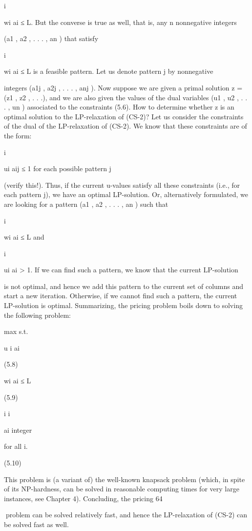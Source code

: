 \documentclass[titlepage]{book}
\theoremstyle{plain}
\theoremstyle{definition}
\theoremstyle{remark}
\begin{document}
i

wi ai ≤ L. But the converse is true as well, that is, any n nonnegative integers

(a1 , a2 , . . . , an ) that satisfy

i

wi ai ≤ L is a feasible pattern. Let us denote pattern j by nonnegative

integers (a1j , a2j , . . . , anj ).
Now suppose we are given a primal solution z = (z1 , z2 , . . .), and we are also given the values of the dual
variables (u1 , u2 , . . . , un ) associated to the constraints (5.6). How to determine whether z is an optimal
solution to the LP-relaxation of (CS-2)? Let us consider the constraints of the dual of the LP-relaxation
of (CS-2). We know that these constraints are of the form:

i

ui aij ≤ 1 for each possible pattern j

(verify this!). Thus, if the current u-values satisfy all these constraints (i.e., for each pattern j), we have
an optimal LP-solution. Or, alternatively formulated, we are looking for a pattern (a1 , a2 , . . . , an ) such
that

i

wi ai ≤ L and

i

ui ai > 1. If we can find such a pattern, we know that the current LP-solution

is not optimal, and hence we add this pattern to the current set of columns and start a new iteration.
Otherwise, if we cannot find such a pattern, the current LP-solution is optimal. Summarizing, the pricing
problem boils down to solving the following problem:

max
s.t.

u i ai

(5.8)

wi ai ≤ L

(5.9)

i
i

ai integer

for all i.

(5.10)

This problem is (a variant of) the well-known knapsack problem (which, in spite of its NP-hardness, can
be solved in reasonable computing times for very large instances, see Chapter 4). Concluding, the pricing
64

problem can be solved relatively fast, and hence the LP-relaxation of (CS-2) can be solved fast as well.
\end{document}

